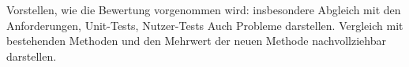 Vorstellen, wie die Bewertung vorgenommen wird: insbesondere Abgleich mit den Anforderungen, Unit-Tests, Nutzer-Tests
Auch Probleme darstellen.
Vergleich mit bestehenden Methoden und den Mehrwert der neuen Methode nachvollziehbar darstellen.